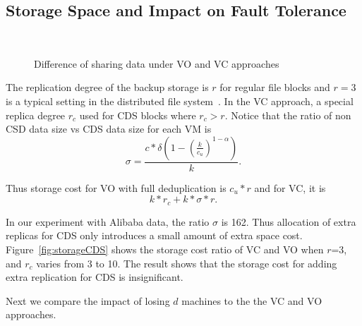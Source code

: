 \subsection{Storage Space and Impact on Fault Tolerance}
 
\begin{figure}
    \centering
    \\
    \caption{Difference of sharing data under VO and VC approaches}
    \label{fig:share}
\end{figure}

The replication degree of the backup storage 
is $r$ for regular file blocks and $r=3$ is a typical setting in the distributed
file system~\cite{Hadoop,GFS}.
In the VC approach, a special replica degree $r_c$ used for CDS blocks where $r_c>r$. 
Notice that the ratio of non CSD data size vs CDS data size for each VM is
\[
\sigma=  \frac{c*\delta(1 -   (\frac{k}{c_u})^{1-\alpha})} {k}.
\]

Thus  storage cost for VO with full deduplication is $c_u *r$ and for VC, it is
\[ k*r_c  + k*\sigma *r.
\]

In our experiment with Alibaba data, the ratio $\sigma$ 
is 162. Thus allocation of extra replicas for CDS only introduces a small amount of extra space
cost.  Figure~\ref{fig:storageCDS} shows the storage cost ratio of VC and VO when 
$r$=3, and $r_c$ varies from 3 to 10.
The result shows that the storage cost for adding extra replication for CDS
is insignificant.


Next we  compare the impact of losing $d$ machines 
to the the VC and VO approaches.  


